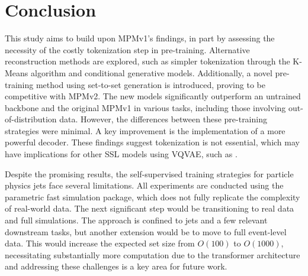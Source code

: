 \section{Conclusion}
\label{sec:conclusion}

This study aims to build upon MPMv1's findings, in part by assessing the necessity of the costly tokenization step in pre-training.
Alternative reconstruction methods are explored, such as simpler tokenization through the K-Means algorithm and conditional generative models.
Additionally, a novel pre-training method using set-to-set generation is introduced, proving to be competitive with MPMv2.
The new models significantly outperform an untrained backbone and the original MPMv1 in various tasks, including those involving out-of-distribution data.
However, the differences between these pre-training strategies were minimal.
A key improvement is the implementation of a more powerful decoder.
These findings suggest tokenization is not essential, which may have implications for other SSL models using VQVAE, such as \textcite{Omnijet}.

Despite the promising results, the self-supervised training strategies for particle physics jets face several limitations.
All experiments are conducted using the parametric \delphes fast simulation package, which does not fully replicate the complexity of real-world data.
The next significant step would be transitioning to real data and full simulations.
The approach is confined to jets and a few relevant downstream tasks, but another extension would be to move to full event-level data.
This would increase the expected set size from $O(100)$ to $O(1000)$, necessitating substantially more computation due to the transformer architecture and addressing these challenges is a key area for future work.
